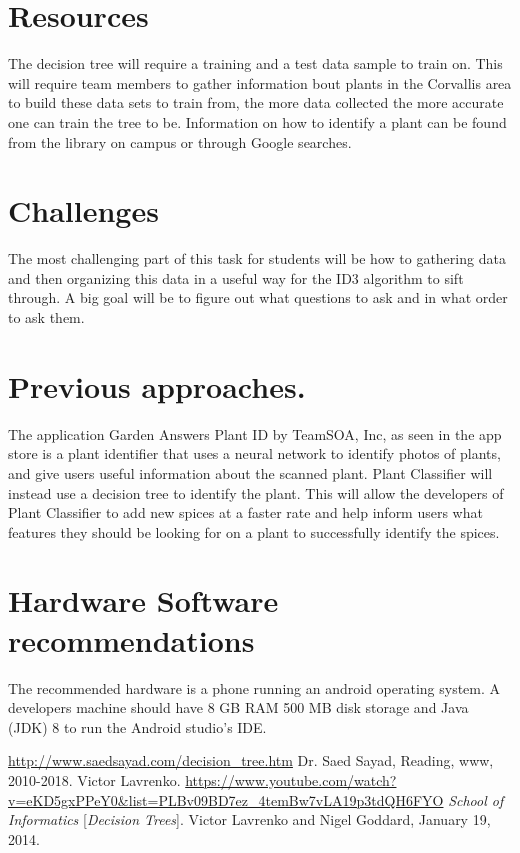 \documentclass[a4paper]{article}
\begin{document}
\section{Resources}
The decision tree will require a training and a test data sample to train on. This will require team members to gather information bout plants in the Corvallis area to build these data sets to train from, the more data collected the more accurate one can train the tree to be. Information on how to identify a plant can be found from the library on campus or through Google searches.
\section{Challenges}
The most challenging part of this task for students will be how to gathering data and then organizing this data in a useful way for the ID3 algorithm to sift through. A big goal will be to figure out what questions to ask and in what order to ask them.
\section{Previous approaches.}
The application Garden Answers Plant ID by TeamSOA, Inc, as seen in the app store is a plant identifier that uses a neural network to identify photos of plants, and give users useful information about the scanned plant. Plant Classifier will instead use a decision tree to identify the plant. This will allow the developers of Plant Classifier to add new spices at a faster rate and help inform users what features they should be looking for on a plant to successfully identify the spices.
\section{Hardware Software recommendations}
The recommended hardware is a phone running an android operating system. A developers machine should have 8 GB RAM 500 MB disk storage and Java (JDK) 8 to run the Android studio's IDE.
\newpage %
\begin{thebibliography}{9}
\url{http://www.saedsayad.com/decision_tree.htm}
Dr. Saed Sayad, Reading, www, 2010-2018.
Victor Lavrenko.
\url{https://www.youtube.com/watch?v=eKD5gxPPeY0&list=PLBv09BD7ez_4temBw7vLA19p3tdQH6FYO}
\textit{School of Informatics} 
[\textit{Decision Trees}]. 
Victor Lavrenko and Nigel Goddard, January 19, 2014.
\end{thebibliography}
\end{document}
